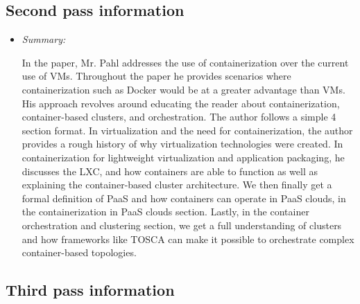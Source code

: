 \documentclass[letterpaper,twocolumn,10pt]{article}
\begin{document}
\subsection{Second pass information}
\label{sec:second}

\begin{itemize}

\item {\it Summary:} 

In the paper, Mr. Pahl addresses the use of containerization over the current use of VMs. Throughout the paper
he provides scenarios where containerization such as Docker would be at a greater advantage than VMs. His approach
revolves around educating the reader about containerization, container-based clusters, and orchestration. The author 
follows a simple 4 section format. In virtualization and the need for containerization, the author provides a rough history 
of why virtualization technologies were created. In containerization for lightweight virtualization and application packaging, 
he discusses the LXC, and how containers are able to function as well as explaining the container-based cluster architecture.
We then finally get a formal definition of PaaS and how containers can operate in PaaS clouds, in the containerization in 
PaaS clouds section. Lastly, in the container orchestration and clustering section, we get a full understanding of clusters and how
frameworks like TOSCA can make it possible to orchestrate complex container-based topologies. 

\end{itemize}

\subsection{Third pass information}
\label{sec:third}
\end{document}
